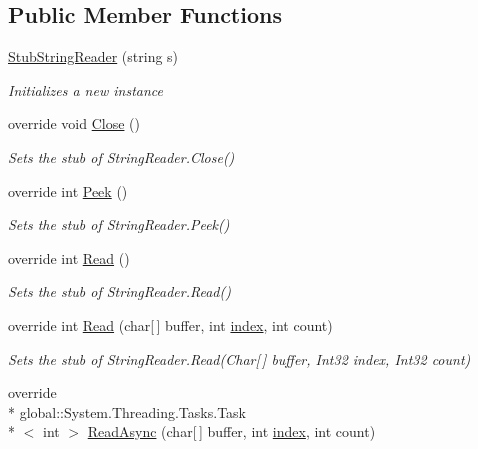 \subsection*{Public Member Functions}
\begin{DoxyCompactItemize}
\item 
\hyperlink{class_system_1_1_i_o_1_1_fakes_1_1_stub_string_reader_a319adccfade63aa09b1ba4ce52a3d4e4}{Stub\-String\-Reader} (string s)
\begin{DoxyCompactList}\small\item\em Initializes a new instance\end{DoxyCompactList}\item 
override void \hyperlink{class_system_1_1_i_o_1_1_fakes_1_1_stub_string_reader_a37823cc34634e78bcce590471a34dde4}{Close} ()
\begin{DoxyCompactList}\small\item\em Sets the stub of String\-Reader.\-Close()\end{DoxyCompactList}\item 
override int \hyperlink{class_system_1_1_i_o_1_1_fakes_1_1_stub_string_reader_a4ad468cd3f69009cde7de814aa44cbb8}{Peek} ()
\begin{DoxyCompactList}\small\item\em Sets the stub of String\-Reader.\-Peek()\end{DoxyCompactList}\item 
override int \hyperlink{class_system_1_1_i_o_1_1_fakes_1_1_stub_string_reader_aa72bebc5a72a3928da1bf3ac2047e63a}{Read} ()
\begin{DoxyCompactList}\small\item\em Sets the stub of String\-Reader.\-Read()\end{DoxyCompactList}\item 
override int \hyperlink{class_system_1_1_i_o_1_1_fakes_1_1_stub_string_reader_a89a719c69afc7f7912a116c68f95a4ec}{Read} (char\mbox{[}$\,$\mbox{]} buffer, int \hyperlink{jquery-1_810_82-vsdoc_8js_a75bb12d1f23302a9eea93a6d89d0193e}{index}, int count)
\begin{DoxyCompactList}\small\item\em Sets the stub of String\-Reader.\-Read(\-Char\mbox{[}$\,$\mbox{]} buffer, Int32 index, Int32 count)\end{DoxyCompactList}\item 
override \\*
global\-::\-System.\-Threading.\-Tasks.\-Task\\*
$<$ int $>$ \hyperlink{class_system_1_1_i_o_1_1_fakes_1_1_stub_string_reader_a8303607c7111d4b44b7bd48a53c8fe7b}{Read\-Async} (char\mbox{[}$\,$\mbox{]} buffer, int \hyperlink{jquery-1_810_82-vsdoc_8js_a75bb12d1f23302a9eea93a6d89d0193e}{index}, int count)

\end{DoxyCompactItemize}
